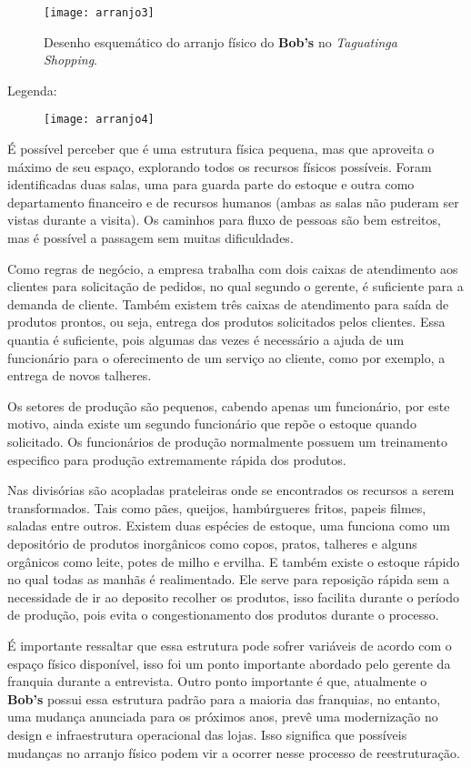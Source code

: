 		\begin{figure}[h]
			\centering
			\texttt{[image: arranjo3]}
			\caption[Desenho esquemático do arranjo físico do Bob's no Taguatinga Shopping]{Desenho esquemático do arranjo físico do \textbf{Bob's} no \emph{Taguatinga Shopping}.}
			\label{fig:arranjo3}
		\end{figure}

		Legenda:
		\begin{figure}[h]
			\centering
			\texttt{[image: arranjo4]}
			\label{fig:arranjo4}
		\end{figure}

		É possível perceber que é uma estrutura física pequena, mas que aproveita o máximo de seu espaço, explorando todos os recursos físicos possíveis. Foram identificadas duas salas, uma para guarda parte do estoque e outra como departamento financeiro e de recursos humanos (ambas as salas não puderam ser vistas durante a visita). Os caminhos para fluxo de pessoas são bem estreitos, mas é possível a passagem sem muitas dificuldades.

		Como regras de negócio, a empresa trabalha com dois caixas de atendimento aos clientes para solicitação de pedidos, no qual segundo o gerente, é suficiente para a demanda de cliente. Também existem três caixas de atendimento para saída de produtos prontos, ou seja, entrega dos produtos solicitados pelos clientes. Essa quantia é suficiente, pois algumas das vezes é necessário a ajuda de um funcionário para o oferecimento de um serviço ao cliente, como por exemplo, a entrega de novos talheres.

		Os setores de produção são pequenos, cabendo apenas um funcionário, por este motivo, ainda existe um segundo funcionário que repõe o estoque quando solicitado. Os funcionários de produção normalmente possuem um treinamento especifico para produção extremamente rápida dos produtos. 
	
		Nas divisórias são acopladas prateleiras onde se encontrados os recursos a serem transformados. Tais como pães, queijos, hambúrgueres fritos, papeis filmes, saladas entre outros. Existem duas espécies de estoque, uma funciona como um depositório de produtos inorgânicos como copos, pratos, talheres e alguns orgânicos como leite, potes de milho e ervilha. E também existe o estoque rápido no qual todas as manhãs é realimentado. Ele serve para reposição rápida sem a necessidade de ir ao deposito recolher os produtos, isso facilita durante o período de produção, pois evita o congestionamento dos produtos durante o processo.

		É importante ressaltar que essa estrutura pode sofrer variáveis de acordo com o espaço físico disponível, isso foi um ponto importante abordado pelo gerente da franquia durante a entrevista. Outro ponto importante é que, atualmente o \textbf{Bob’s} possui essa estrutura padrão para a maioria das franquias, no entanto, uma mudança anunciada para os próximos anos, prevê uma modernização no design e infraestrutura operacional das lojas. Isso significa que possíveis mudanças no arranjo físico podem vir a ocorrer nesse processo de reestruturação.
